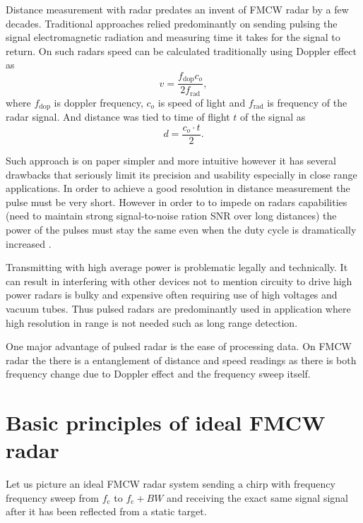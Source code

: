 Distance measurement with radar predates an invent of FMCW radar by a few decades.
Traditional approaches relied predominantly on sending pulsing the signal electromagnetic radiation and measuring time it takes for the signal to return.
On such radars speed can be calculated traditionally using Doppler effect as
\begin{equation}
	v = \frac{f_\mathrm{dop} c_o}{2f_\mathrm{rad}},
	\label{eq:dopler}
\end{equation}
where $f_\mathrm{dop}$ is doppler frequency, $c_o$ is speed of light and $f_\mathrm{rad}$ is frequency of the radar signal.
And distance was tied to time of flight $t$ of the signal as
\begin{equation}
	d = \frac{c_o \cdot t}{2}.
	\label{eq:distance}
\end{equation}

Such approach is on paper simpler and more intuitive however it has several drawbacks that seriously limit its precision and usability especially in close range applications.
In order to achieve a good resolution in distance measurement the pulse must be very short.
However in order to to impede on radars capabilities (need to maintain strong signal-to-noise ration SNR over long distances) the power of the pulses must stay the same even when the duty cycle is dramatically increased \cite{jankiraman2018}.

Transmitting with high average power is problematic legally and technically.
It can result in interfering with other devices not to mention circuity to drive high power radars is bulky and expensive often requiring use of high voltages and vacuum tubes.
Thus pulsed radars are predominantly used in application where high resolution in range is not needed such as long range detection.

One major advantage of pulsed radar is the ease of processing data.
On FMCW radar the there is a entanglement of distance and speed readings as there is both frequency change due to Doppler effect and the frequency sweep itself.

\section{Basic principles of ideal FMCW radar}

Let us picture an ideal FMCW radar system sending a chirp with frequency frequency sweep from $f_\mathrm{c}$ to $f_\mathrm{c}+BW$ and receiving the exact same signal signal after it has been reflected from a static target.

